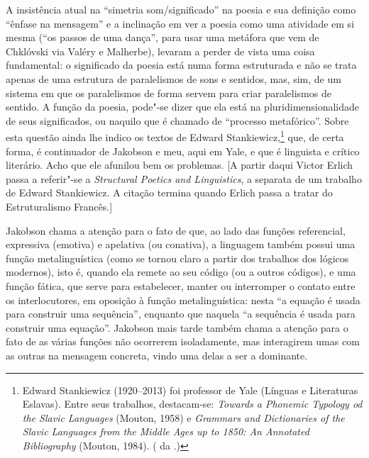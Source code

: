 A insistência atual na ``simetria som/significado'' na poesia e sua
definição como ``ênfase na mensagem'' e a inclinação em ver a poesia
como uma atividade em si mesma (``os passos de uma dança'', para usar
uma metáfora que vem de Chklóvski via Valéry e Malherbe), levaram a
perder de vista uma coisa fundamental: o significado da poesia está numa
forma estruturada e não se trata apenas de uma estrutura de paralelismos
de sons e sentidos, mas, sim, de um sistema em que os paralelismos de
forma servem para criar paralelismos de sentido. A função da poesia,
pode"-se dizer que ela está na pluridimensionalidade de seus significados, ou
naquilo que é chamado de ``processo metafórico''.
Sobre esta questão ainda lhe indico os textos de Edward Stankiewicz,\footnote{Edward
 Stankiewicz (1920--2013) foi professor de Yale (Línguas e Literaturas
 Eslavas). Entre seus trabalhos, destacam-se: \emph{Towards a 
Phonemic Typology od the Slavic Languages} (Mouton, 1958) e 
\emph{Grammars and Dictionaries of the Slavic Languages from the 
Middle Ages up to 1850: An Annotated Bibliography} (Mouton, 1984).
 ( da .)} que,
de certa forma, é continuador de Jakobson e meu, aqui em Yale, e que é
linguista e crítico literário. Acho que ele afunilou bem os problemas.
 [A partir daqui Victor Erlich passa a referir"-se a
 \emph{Structural Poetics and Linguistics}, a separata de um
 trabalho de Edward Stankiewicz. A citação termina quando Erlich passa
 a tratar do Estruturalismo Francês.]

Jakobson chama a atenção para o fato de que, ao lado das funções
referencial, expressiva (emotiva) e apelativa (ou conativa), a linguagem
também possui uma função metalinguística (como se tornou claro a partir
dos trabalhos dos lógicos modernos), isto é, quando ela remete ao seu
código (ou a outros códigos), e uma função fática, que serve para
estabelecer, manter ou interromper o contato entre os interlocutores, em
oposição à função metalinguística: nesta ``a equação é usada para
construir uma sequência'', enquanto que naquela ``a sequência é usada
para construir uma equação''. Jakobson mais tarde também chama a atenção para o
fato de as várias funções não ocorrerem isoladamente, mas interagirem
umas com as outras na mensagem concreta, vindo uma delas a ser a
dominante.

